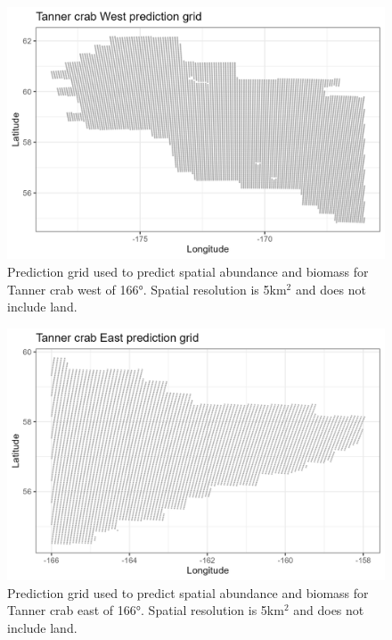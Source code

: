 \documentclass[
]{article}
\begin{document}
\begin{figure}

{\centering \includegraphics[width=6in]{../BAIRDI/Figures/west_predgrid} 

}

\caption{Prediction grid used to predict spatial abundance and biomass for Tanner crab west of 166°. Spatial resolution is 5km$^2$ and does not include land.}\label{fig:bairdi-west-grid}
\end{figure}

\begin{figure}

{\centering \includegraphics[width=6in]{../BAIRDI/Figures/east_predgrid} 

}

\caption{Prediction grid used to predict spatial abundance and biomass for Tanner crab east of 166°. Spatial resolution is 5km$^2$ and does not include land.}\label{fig:bairdi-east-grid}
\end{figure}
\end{document}
